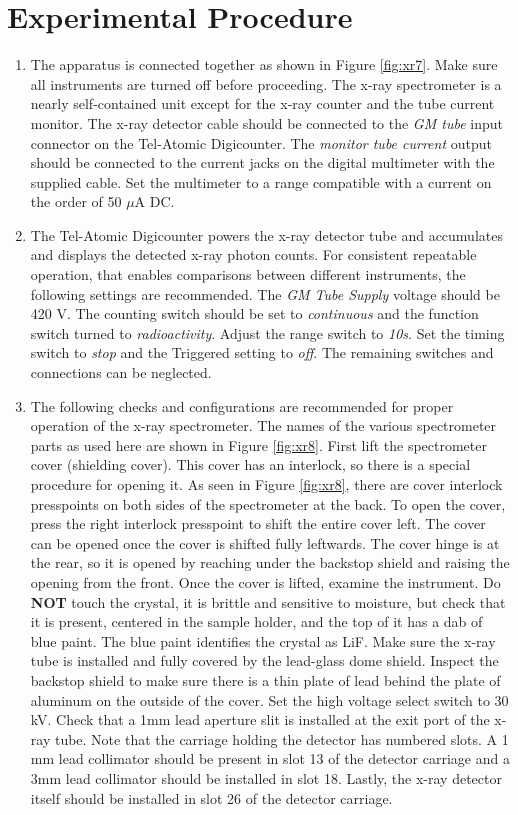 \section{Experimental Procedure}
\begin{enumerate}
\item The apparatus is connected together as shown in Figure \ref{fig:xr7}. Make sure all instruments are turned off before proceeding. The x-ray spectrometer is a nearly self-contained unit except for the x-ray counter and the tube current monitor. The x-ray detector cable should be connected to the \textit{GM tube} input connector on the Tel-Atomic Digicounter. The \textit{monitor tube current} output should be connected to the current jacks on the digital multimeter with the supplied cable. Set the multimeter to a range compatible with a current on the order of 50 $\mu$A DC.

\item The Tel-Atomic Digicounter powers the x-ray detector tube and accumulates and displays the detected x-ray photon counts. For consistent repeatable operation, that enables comparisons between different instruments, the following settings are recommended. The \textit{GM Tube Supply} voltage should be 420 V. The counting switch should be set to \textit{continuous} and the function switch turned to \textit{radioactivity}. Adjust the range switch to \textit{10s}. Set the timing switch to \textit{stop} and the Triggered setting to \textit{off}. The remaining switches and connections can be neglected.

\item The following checks and configurations are recommended for proper operation of the x-ray spectrometer. The names of the various spectrometer parts as used here are shown in Figure \ref{fig:xr8}. First lift the spectrometer cover (shielding cover). This cover has an interlock, so there is a special procedure for opening it. As seen in Figure \ref{fig:xr8}, there are cover interlock presspoints on both sides of the spectrometer at the back. To open the cover, press the right interlock presspoint to shift the entire cover left. The cover can be opened once the cover is shifted fully leftwards. The cover hinge is at the rear, so it is opened by reaching under the backstop shield and raising the opening from the front. Once the cover is lifted, examine the instrument. Do {\bf NOT} touch the crystal, it is brittle and sensitive to moisture, but check that it is present, centered in the sample holder, and the top of it has a dab of blue paint. The blue paint identifies the crystal as LiF. Make sure the x-ray tube is installed and fully covered by the lead-glass dome shield. Inspect the backstop shield to make sure there is a thin plate of lead behind the plate of aluminum on the outside of the cover. Set the high voltage select switch to 30 kV. Check that a 1mm lead aperture slit is installed at the exit port of the x-ray tube. Note that the carriage holding the detector has numbered slots. A 1 mm lead collimator should be present in slot 13 of the detector carriage and a 3mm lead collimator should be installed in slot 18. Lastly, the x-ray detector itself should be installed in slot 26 of the detector carriage.


\end{enumerate}
